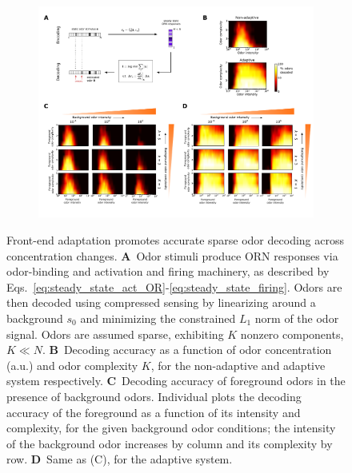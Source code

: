 \begin{figure}[!tb]
	\centering
	\begin{subfigure}[t]{\linewidth}
		\includegraphics[width=\textwidth]{figures/3_decoding_discimination}
		\label{fig:decoding_a}
	\end{subfigure}
	\begin{subfigure}[t]{0\linewidth}
		\label{fig:decoding_b}
	\end{subfigure}
	\begin{subfigure}[t]{0\linewidth}
		\label{fig:decoding_c}
	\end{subfigure}
	\begin{subfigure}[t]{0\linewidth}
		\label{fig:decoding_d}
	\end{subfigure}
	\caption{\footnotesize{Front-end adaptation promotes accurate sparse odor decoding across concentration changes. 
    \textbf{A}~Odor stimuli produce ORN responses via odor-binding and activation and firing machinery, as described by Eqs.~\ref{eq:steady_state_act_OR}-\ref{eq:steady_state_firing}. Odors are then decoded using compressed sensing by linearizing around a background $s_0$ and minimizing the constrained $L_1$ norm of the odor signal.  Odors are assumed sparse, exhibiting $K$ nonzero components, $K \ll N$. 
    \textbf{B}~Decoding accuracy as a function of odor concentration (a.u.) and odor complexity $K$, for the non-adaptive and adaptive system respectively. 
    \textbf{C}~Decoding accuracy of foreground odors in the presence of background odors. Individual plots the decoding accuracy of the foreground as a function of its intensity and complexity, for the given background odor conditions; the intensity of the background odor increases by column and its complexity by row.
    \textbf{D}~Same as (C), for the adaptive system.}}
	\label{fig:decoding}
\end{figure}



